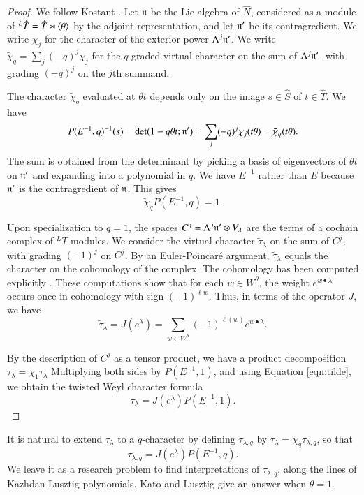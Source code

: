 \begin{proof} 
  We follow Kostant \cite{kostant1961lie}.  Let ${\mathfrak n}$ be the Lie
  algebra of $\hat N$, considered as a module of ${}^L\hat T=\hat
  T\rtimes\langle{\theta}\rangle$ by the adjoint representation, and let ${\mathfrak n}'$
  be its contragredient.  We write $\chi_j$ for the character of the
  exterior power $\Lambda^j {\mathfrak n}'$.  We write $\tilde\chi_q = \sum_j
  (-q)^j\chi_j$ for the $q$-graded virtual character on the sum of
  $\Lambda^j {\mathfrak n}'$, with grading $(-q)^j$ on the $j$th summand.

  The character $\tilde\chi_q$ evaluated at $\theta t$ depends only on
  the image $s\in\hat S$ of $t\in \hat T$.  We have
\[
P(E^{-1},q)^{-1}(s) = \det(1- q\theta t;{\mathfrak n}') 
= \sum_j (-q)^j \chi_j(t\theta) = \tilde\chi_q(t\theta).
\]
The sum is obtained from the determinant by picking a basis of
eigenvectors of $\theta t$ on ${\mathfrak n}'$ and expanding into a polynomial in
$q$.  We have $E^{-1}$ rather than $E$ because ${\mathfrak n}'$ is the
contragredient of ${\mathfrak n}$.  This gives
\begin{equation}\label{eqn:tilde}
\tilde\chi_q P(E^{-1},q) = 1.
\end{equation}

Upon specialization to $q=1$, the spaces $C^j=\Lambda^j {\mathfrak n}'\otimes
V_\lambda$ are the terms of a cochain complex of ${}^LT$-modules.  We
consider the virtual character $\tilde \tau_\lambda$ on the sum of
$C^j$, with grading $(-1)^j$ on $C^j$.  By an Euler-Poincar\'e
argument, $\tilde\tau_\lambda$ equals the character on the cohomology
of the complex.  The cohomology has been computed explicitly
\cite{kostant1961lie}.  These computations show that for each $w\in
W^\theta$, the weight $e^{w\bullet \lambda}$ occurs once in cohomology
with sign $(-1)^{\ell w}$.  Thus, in terms of the operator $J$, we
have
\[
\tilde \tau_\lambda = J(e^\lambda) 
= \sum_{w\in W^\theta} (-1)^{\ell(w)} e^{w\bullet\lambda}.
\]

By the description of $C^j$ as a tensor
product,
we have a product decomposition $\tilde \tau_\lambda = \tilde
\chi_{1}\tau_\lambda $   Multiplying both sides by $P(E^{-1},1)$, and using Equation
\ref{eqn:tilde}, we obtain the twisted Weyl character formula
\begin{equation}
\tau_\lambda = J(e^\lambda) P(E^{-1},1).
\end{equation}
\end{proof}

It is natural to extend $\tau_\lambda$ to a $q$-character by defining
$\tau_{\lambda,q}$ by $\tilde \tau_\lambda = \tilde
\chi_q\tau_{\lambda,q} $, so that
\begin{equation}\label{eqn:tauq}
\tau_{\lambda,q} = J(e^\lambda) P(E^{-1},q).
\end{equation}
We leave it as a research problem to find interpretations of
$\tau_{\lambda,q}$, along the lines of Kazhdan-Lusztig polynomials.
Kato and Lusztig give an answer when $\theta=1$.


